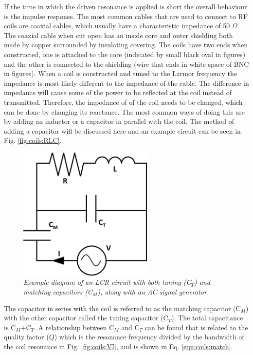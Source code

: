 If the time in which the driven resonance is applied is short the overall behaviour is the impulse response. The most common cables that are used to connect to \ac{RF} coils are coaxial cables, which usually have a characteristic impedance of 50 $\Omega$. The coaxial cable when cut open has an inside core and outer shielding both made by copper surrounded by insulating covering. The coils have two ends when constructed, one is attached to the core (indicated by small black oval in figures) and the other is connected to the shielding (wire that ends in white space of BNC in figures). When a coil is constructed and tuned to the Larmor frequency the impedance is most likely different to the impedance of the cable. The difference in impedance will cause some of the power to be reflected at the coil instead of transmitted. Therefore, the impedance of of the coil needs to be changed, which can be done by changing its reactance. The most common ways of doing this are by adding an inductor or a capacitor in parallel with the coil. The method of adding a capacitor will be discussed here and an example circuit can be seen in Fig. \ref{fig:coils:RLC}.

\begin{figure}
    \centering
    \includegraphics[width=0.6\textwidth]{Figures/Coils/RLC_Circuit_Match.png}
    \caption{\textit{Example diagram of an LCR circuit with both tuning (C$_T$) and matching capacitors (C$_M$), along with an AC signal generator.}}
    \label{fig:coils:RLC_match}
\end{figure}

The capacitor in series with the coil is referred to as the matching capacitor (C$_M$) with the other capacitor called the tuning capacitor (C$_T$). The total capacitance is C$_M$+C$_T$. A relationship between C$_M$ and C$_T$ can be found that is related to the quality factor ($Q$) \cite{Chen1989ChapterNoise} which is the resonance frequency divided by the bandwidth of the coil resonance in Fig. \ref{fig:coils:VI}, and is shown in Eq. \ref{eqn:coils:match}. 

